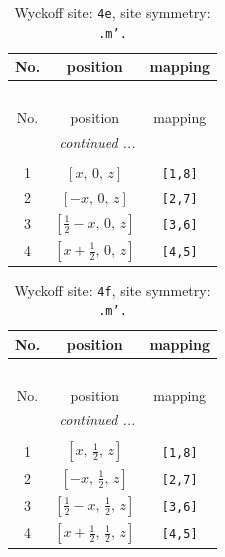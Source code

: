 \documentclass[fleqn,8pt]{jsarticle}
\begin{document}
\begin{longtable}{ccc}
\caption{Wyckoff site: {\tt 4e}, site symmetry: {\tt .m'.}}
 \\
 \hline \hline
No. & position & mapping \\ \hline \endfirsthead

\multicolumn{2}{l}{\tablename\ \thetable{}} \\
 \hline \hline
No. & position & mapping \\ \hline \endhead

 \hline \hline
\multicolumn{2}{r}{\footnotesize\it continued ...} \\ \endfoot

 \hline \hline
\multicolumn{2}{r}{} \\ \endlastfoot

1 & $\left[ x,\, 0,\, z \right]$ & {\tt [1,8]} \\ \hline
2 & $\left[ - x,\, 0,\, z \right]$ & {\tt [2,7]} \\ \hline
3 & $\left[ \frac{1}{2} - x,\, 0,\, z \right]$ & {\tt [3,6]} \\ \hline
4 & $\left[ x + \frac{1}{2},\, 0,\, z \right]$ & {\tt [4,5]} \\
\end{longtable}
\renewcommand{\arraystretch}{1.2}
\begin{longtable}{ccc}
\caption{Wyckoff site: {\tt 4f}, site symmetry: {\tt .m'.}}
 \\
 \hline \hline
No. & position & mapping \\ \hline \endfirsthead

\multicolumn{2}{l}{\tablename\ \thetable{}} \\
 \hline \hline
No. & position & mapping \\ \hline \endhead

 \hline \hline
\multicolumn{2}{r}{\footnotesize\it continued ...} \\ \endfoot

 \hline \hline
\multicolumn{2}{r}{} \\ \endlastfoot

1 & $\left[ x,\, \frac{1}{2},\, z \right]$ & {\tt [1,8]} \\ \hline
2 & $\left[ - x,\, \frac{1}{2},\, z \right]$ & {\tt [2,7]} \\ \hline
3 & $\left[ \frac{1}{2} - x,\, \frac{1}{2},\, z \right]$ & {\tt [3,6]} \\ \hline
4 & $\left[ x + \frac{1}{2},\, \frac{1}{2},\, z \right]$ & {\tt [4,5]} \\
\end{longtable}
\end{document}
